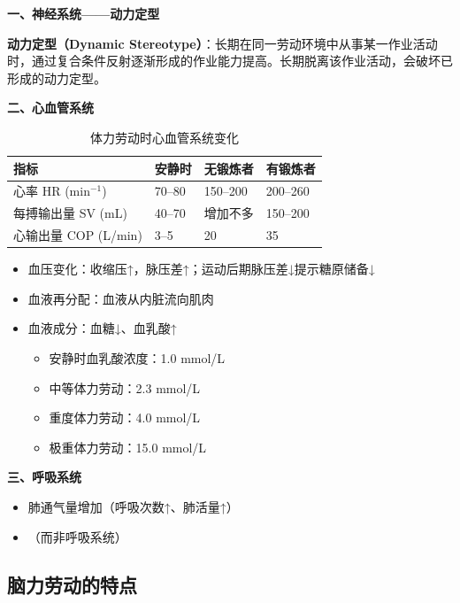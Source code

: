 \begin{keybox}
\textbf{一、神经系统——动力定型}

\begin{defbox}
\textbf{动力定型（Dynamic Stereotype）}：长期在同一劳动环境中从事某一作业活动时，通过复合条件反射逐渐形成的作业能力提高。长期脱离该作业活动，会破坏已形成的动力定型。
\end{defbox}

\textbf{二、心血管系统}

\begin{table}[H]
\centering
\caption{体力劳动时心血管系统变化}
\begin{tabularx}{\textwidth}{lXXX}
\hline
\textbf{指标} & \textbf{安静时} & \textbf{无锻炼者} & \textbf{有锻炼者} \\
\hline
心率 HR (min$^{-1}$) & 70--80 & 150--200 & 200--260 \\
每搏输出量 SV (mL) & 40--70 & 增加不多 & 150--200 \\
心输出量 COP (L/min) & 3--5 & 20 & 35 \\
\hline
\end{tabularx}
\end{table}

\begin{itemize}[leftmargin=*]
    \item 血压变化：收缩压↑，脉压差↑；运动后期脉压差↓提示糖原储备↓
    \item 血液再分配：血液从内脏流向肌肉
    \item 血液成分：血糖↓、血乳酸↑
    \begin{itemize}
        \item 安静时血乳酸浓度：1.0 mmol/L
        \item 中等体力劳动：2.3 mmol/L
        \item 重度体力劳动：4.0 mmol/L
        \item 极重体力劳动：15.0 mmol/L
    \end{itemize}
\end{itemize}

\textbf{三、呼吸系统}
\begin{itemize}[leftmargin=*]
    \item 肺通气量增加（呼吸次数↑、肺活量↑）
    \item {}（而非呼吸系统）
\end{itemize}
\end{keybox}

\subsection{脑力劳动的特点}

